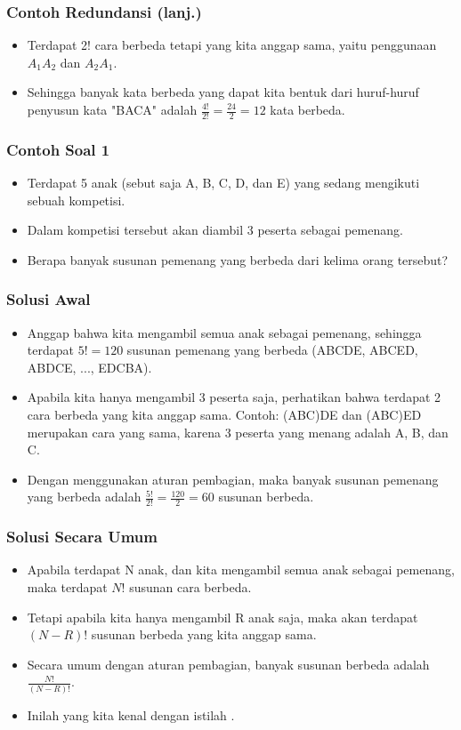 \begin{frame}
\frametitle{Contoh Redundansi (lanj.)}
\begin{itemize}
  \item Terdapat 2! cara berbeda tetapi yang kita anggap sama, yaitu penggunaan $A_{1}A_{2}$ dan $A_{2}A_{1}$.
  \item Sehingga banyak kata berbeda yang dapat kita bentuk dari huruf-huruf penyusun kata "BACA" adalah $\frac{4!}{2!} = \frac{24}{2} = 12$ kata berbeda.
\end{itemize}
\end{frame}

\begin{frame}
\frametitle{Contoh Soal 1}
\begin{itemize}
  \item Terdapat 5 anak (sebut saja A, B, C, D, dan E) yang sedang mengikuti sebuah kompetisi.
  \item Dalam kompetisi tersebut akan diambil 3 peserta sebagai pemenang.
  \item Berapa banyak susunan pemenang yang berbeda dari kelima orang tersebut?
\end{itemize}
\end{frame}

\begin{frame}
\frametitle{Solusi Awal}
\begin{itemize}
  \item Anggap bahwa kita mengambil semua anak sebagai pemenang, sehingga terdapat $5! = 120$ susunan pemenang yang berbeda (ABCDE, ABCED, ABDCE, ..., EDCBA).
  \item Apabila kita hanya mengambil 3 peserta saja, perhatikan bahwa terdapat 2 cara berbeda yang kita anggap sama. Contoh: (ABC)DE dan (ABC)ED merupakan cara yang sama, karena 3 peserta yang menang adalah A, B, dan C.
  \item Dengan menggunakan aturan pembagian, maka banyak susunan pemenang yang berbeda adalah $\frac{5!}{2!} = \frac{120}{2} = 60$ susunan berbeda.
\end{itemize}
\end{frame}

\begin{frame}
\frametitle{Solusi Secara Umum}
\begin{itemize}
  \item Apabila terdapat N anak, dan kita mengambil semua anak sebagai pemenang, maka terdapat $N!$ susunan cara berbeda.
  \item Tetapi apabila kita hanya mengambil R anak saja, maka akan terdapat $(N-R)!$ susunan berbeda yang kita anggap sama.
  \item Secara umum dengan aturan pembagian, banyak susunan berbeda adalah $\frac{N!}{(N-R)!}$.
  \item Inilah yang kita kenal dengan istilah .
\end{itemize}
\end{frame}


